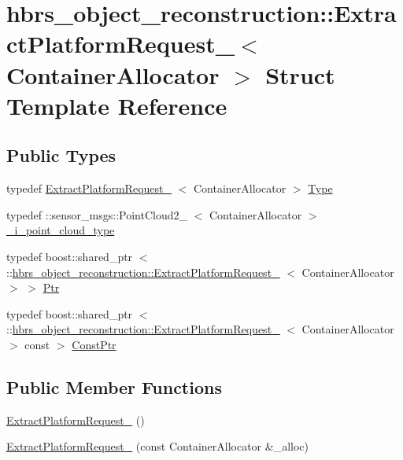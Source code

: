 \hypertarget{structhbrs__object__reconstruction_1_1_extract_platform_request__}{\section{hbrs\-\_\-object\-\_\-reconstruction\-:\-:\-Extract\-Platform\-Request\-\_\-$<$ \-Container\-Allocator $>$ \-Struct \-Template \-Reference}
\label{structhbrs__object__reconstruction_1_1_extract_platform_request__}
}
\subsection*{\-Public \-Types}
\begin{DoxyCompactItemize}
\item 
typedef \*
\hyperlink{structhbrs__object__reconstruction_1_1_extract_platform_request__}{\-Extract\-Platform\-Request\-\_\-}\*
$<$ \-Container\-Allocator $>$ \hyperlink{structhbrs__object__reconstruction_1_1_extract_platform_request___aa0aac3252314b85c5f8de66313a3144a}{\-Type}
\item 
typedef \*
\-::sensor\-\_\-msgs\-::\-Point\-Cloud2\-\_\-\*
$<$ \-Container\-Allocator $>$ \hyperlink{structhbrs__object__reconstruction_1_1_extract_platform_request___a4f57580f0c3987e492f8dbe76c54f8fb}{\-\_\-i\-\_\-point\-\_\-cloud\-\_\-type}
\item 
typedef boost\-::shared\-\_\-ptr\*
$<$ \-::\hyperlink{structhbrs__object__reconstruction_1_1_extract_platform_request__}{hbrs\-\_\-object\-\_\-reconstruction\-::\-Extract\-Platform\-Request\-\_\-}\*
$<$ \-Container\-Allocator $>$ $>$ \hyperlink{structhbrs__object__reconstruction_1_1_extract_platform_request___acc9d0c8b4a454a52f50082f6d5cca948}{\-Ptr}
\item 
typedef boost\-::shared\-\_\-ptr\*
$<$ \-::\hyperlink{structhbrs__object__reconstruction_1_1_extract_platform_request__}{hbrs\-\_\-object\-\_\-reconstruction\-::\-Extract\-Platform\-Request\-\_\-}\*
$<$ \-Container\-Allocator $>$ const  $>$ \hyperlink{structhbrs__object__reconstruction_1_1_extract_platform_request___ae4179c7c14d509e044221a3f1f8129d2}{\-Const\-Ptr}
\end{DoxyCompactItemize}
\subsection*{\-Public \-Member \-Functions}
\begin{DoxyCompactItemize}
\item 
\hyperlink{structhbrs__object__reconstruction_1_1_extract_platform_request___afc499e24e82cae4352af2d88c987d119}{\-Extract\-Platform\-Request\-\_\-} ()
\item 
\hyperlink{structhbrs__object__reconstruction_1_1_extract_platform_request___a42764ba54bedd937c24c013db54315e0}{\-Extract\-Platform\-Request\-\_\-} (const \-Container\-Allocator \&\-\_\-alloc)
\end{DoxyCompactItemize}
